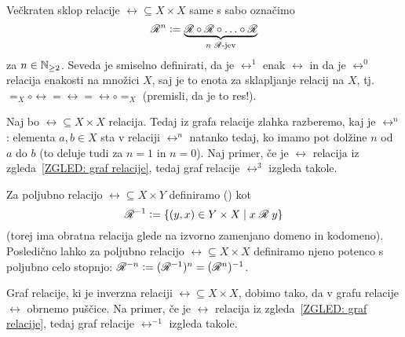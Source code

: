 		Večkraten sklop relacije $\rel \subseteq X \times X$ same s sabo označimo
		\[\rel^n \dfeq \underbrace{\rel \circ \rel \circ \ldots \circ \rel}_{\text{$n$ $\rel$-jev}}\]
		za $n \in \mathbb{N}_{\geq 2}$. Seveda je smiselno definirati, da je $\rel^1$ enak $\rel$ in da je $\rel^0$ relacija enakosti na množici $X$, saj je to enota za sklapljanje relacij na $X$, tj.~$=_X \circ \rel = \rel = \rel \circ =_X$ (premisli, da je to res!).
		
		\begin{zgled}
			Naj bo $\rel \subseteq X \times X$ relacija. Tedaj iz grafa relacije zlahka razberemo, kaj je $\rel^n$: elementa $a, b \in X$ sta v relaciji $\rel^n$ natanko tedaj, ko imamo pot dolžine $n$ od $a$ do $b$ (to deluje tudi za $n = 1$ in $n = 0$). Naj primer, če je $\rel$ relacija iz zgleda~\ref{ZGLED: graf relacije}, tedaj graf relacije $\rel^3$ izgleda takole.
			
		\end{zgled}
		
		Za poljubno relacijo $\rel \subseteq X \times Y$ definiramo  () \df{relacijo} kot
		\[\rel^{-1} \dfeq \set{(y, x) \in Y \times X}{\rel[x][y]}\]
		(torej ima obratna relacija glede na izvorno zamenjano domeno in kodomeno). Posledično lahko za poljubno relacijo $\rel \subseteq X \times X$ definiramo njeno potenco s poljubno celo stopnjo: $\rel^{-n} \dfeq (\rel^{-1})^n = (\rel^n)^{-1}$.
		
		\begin{zgled}
			Graf relacije, ki je inverzna relaciji $\rel \subseteq X \times X$, dobimo tako, da v grafu relacije $\rel$ obrnemo puščice. Na primer, če je $\rel$ relacija iz zgleda~\ref{ZGLED: graf relacije}, tedaj graf relacije $\rel^{-1}$ izgleda takole.
			
			\note{graf $\rel^{-1}$}
		\end{zgled}
		
